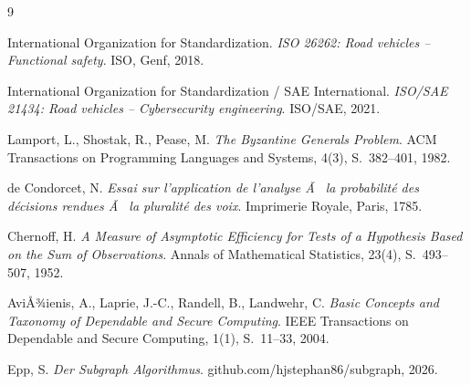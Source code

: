 ﻿\documentclass[a4paper,12pt]{article}
\theoremstyle{definition}
\begin{document}
\begin{thebibliography}{9}

International Organization for Standardization.
\emph{ISO 26262: Road vehicles -- Functional safety}.
ISO, Genf, 2018.

International Organization for Standardization / SAE International.
\emph{ISO/SAE 21434: Road vehicles -- Cybersecurity engineering}.
ISO/SAE, 2021.

Lamport, L., Shostak, R., Pease, M.
\emph{The Byzantine Generals Problem}.
ACM Transactions on Programming Languages and Systems, 4(3), S.~382--401, 1982.

de Condorcet, N.
\emph{Essai sur l'application de l'analyse Ã  la probabilité des décisions rendues Ã  la pluralité des voix}.
Imprimerie Royale, Paris, 1785.

Chernoff, H.
\emph{A Measure of Asymptotic Efficiency for Tests of a Hypothesis Based on the Sum of Observations}.
Annals of Mathematical Statistics, 23(4), S.~493--507, 1952.

AviÅ¾ienis, A., Laprie, J.-C., Randell, B., Landwehr, C.
\emph{Basic Concepts and Taxonomy of Dependable and Secure Computing}.
IEEE Transactions on Dependable and Secure Computing, 1(1), S.~11--33, 2004.

Epp, S.
\emph{Der Subgraph Algorithmus}.
github.com/hjstephan86/subgraph, 2026.

\end{thebibliography}
\end{document}
